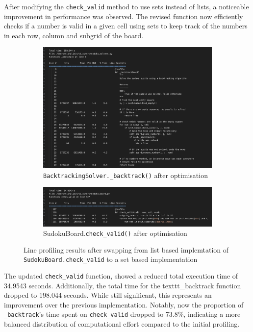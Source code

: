 \documentclass[11pt]{article}
\begin{document}
After modifying the \texttt{check\_valid} method to use sets instead of lists, a noticeable improvement in performance was observed. The revised function now efficiently checks if a number is valid in a given cell using sets to keep track of the numbers in each row, column and subgrid of the board. 

\begin{figure}[H]
    \centering
    \begin{subfigure}[b]{0.8\textwidth}
        \includegraphics[width=\textwidth]{figs/bt_line_profile_after.png}
        \caption{\texttt{BacktrackingSolver.\_backtrack()} after optimisation}
        \label{fig:backtrack_after}
    \end{subfigure}
    \begin{subfigure}[b]{0.8\textwidth}
        \includegraphics[width=\textwidth]{figs/check_valid_after.png}
        \caption{SudokuBoard.\texttt{check\_valid()} after optimisation}
        \label{fig:check_valid_after}
    \end{subfigure}
    \caption{Line profiling results after swapping from list based implemtation of \texttt{SudokuBoard.check\_valid} to a set based implementation}
    \label{fig:line_profiling_after}
\end{figure}
The updated \texttt{check\_valid} function, showed a reduced total execution time of 34.9543 seconds. Additionally, the total time for the texttt{\_backtrack} function dropped to 198.044 seconds. While still significant, this represents an improvement over the previous implementation. Notably, now the proportion of \texttt{\_backtrack}'s time  spent on \texttt{check\_valid} dropped to 73.8\%, indicating a more balanced distribution of computational effort compared to the initial profiling.
\end{document}
